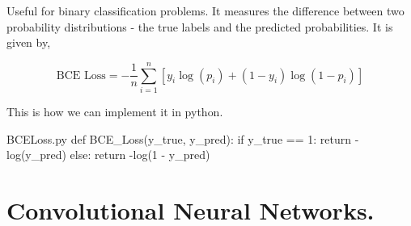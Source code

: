 \documentclass[12pt]{article}
\begin{document}
Useful for binary classification problems. It measures the difference between two probability distributions - the true labels and the predicted probabilities. It is given by, 

\[
  \text{BCE Loss} = -\frac{1}{n} \sum_{i=1}^{n} [y_i \log(p_i) + (1 - y_i) \log(1 - p_i)] 
\]

This is how we can implement it in python. 

\vspace*{0.1in}


\begin{maclisting}[language=Python]{BCELoss.py}
def BCE_Loss(y_true, y_pred):
    if y_true == 1:
        return -log(y_pred)
    else:
        return -log(1 - y_pred)  
\end{maclisting}

\newpage
\section*{Convolutional Neural Networks.}
\end{document}
